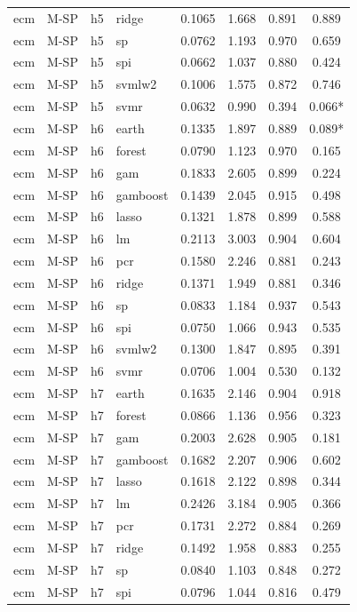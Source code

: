 \begin{ThreePartTable}
\begin{longtable}[t]{llclcccc}
ecm & M-SP & h5 & ridge & 0.1065 & 1.668 & 0.891 & 0.889\\
ecm & M-SP & h5 & sp & 0.0762 & 1.193 & 0.970 & 0.659\\
ecm & M-SP & h5 & spi & 0.0662 & 1.037 & 0.880 & 0.424\\
ecm & M-SP & h5 & svmlw2 & 0.1006 & 1.575 & 0.872 & 0.746\\
ecm & M-SP & h5 & svmr & 0.0632 & 0.990 & 0.394 & 0.066*\\
\addlinespace
ecm & M-SP & h6 & earth & 0.1335 & 1.897 & 0.889 & 0.089*\\
ecm & M-SP & h6 & forest & 0.0790 & 1.123 & 0.970 & 0.165\\
ecm & M-SP & h6 & gam & 0.1833 & 2.605 & 0.899 & 0.224\\
ecm & M-SP & h6 & gamboost & 0.1439 & 2.045 & 0.915 & 0.498\\
ecm & M-SP & h6 & lasso & 0.1321 & 1.878 & 0.899 & 0.588\\
ecm & M-SP & h6 & lm & 0.2113 & 3.003 & 0.904 & 0.604\\
ecm & M-SP & h6 & pcr & 0.1580 & 2.246 & 0.881 & 0.243\\
ecm & M-SP & h6 & ridge & 0.1371 & 1.949 & 0.881 & 0.346\\
ecm & M-SP & h6 & sp & 0.0833 & 1.184 & 0.937 & 0.543\\
ecm & M-SP & h6 & spi & 0.0750 & 1.066 & 0.943 & 0.535\\
ecm & M-SP & h6 & svmlw2 & 0.1300 & 1.847 & 0.895 & 0.391\\
ecm & M-SP & h6 & svmr & 0.0706 & 1.004 & 0.530 & 0.132\\
\addlinespace
ecm & M-SP & h7 & earth & 0.1635 & 2.146 & 0.904 & 0.918\\
ecm & M-SP & h7 & forest & 0.0866 & 1.136 & 0.956 & 0.323\\
ecm & M-SP & h7 & gam & 0.2003 & 2.628 & 0.905 & 0.181\\
ecm & M-SP & h7 & gamboost & 0.1682 & 2.207 & 0.906 & 0.602\\
ecm & M-SP & h7 & lasso & 0.1618 & 2.122 & 0.898 & 0.344\\
ecm & M-SP & h7 & lm & 0.2426 & 3.184 & 0.905 & 0.366\\
ecm & M-SP & h7 & pcr & 0.1731 & 2.272 & 0.884 & 0.269\\
ecm & M-SP & h7 & ridge & 0.1492 & 1.958 & 0.883 & 0.255\\
ecm & M-SP & h7 & sp & 0.0840 & 1.103 & 0.848 & 0.272\\
ecm & M-SP & h7 & spi & 0.0796 & 1.044 & 0.816 & 0.479\\

\end{longtable}
\end{ThreePartTable}
